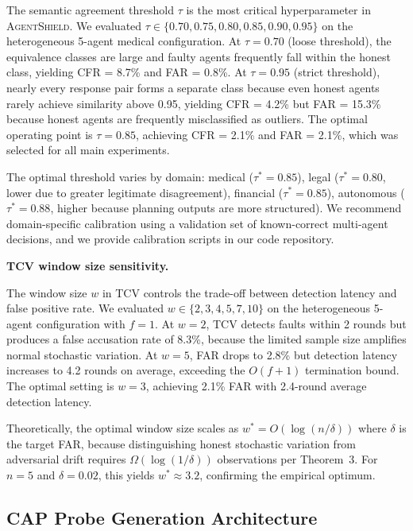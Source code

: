 \documentclass[journal,10pt]{IEEEtran}
\begin{document}
The semantic agreement threshold $\tau$ is the most critical hyperparameter in \textsc{AgentShield}. We evaluated $\tau \in \{0.70, 0.75, 0.80, 0.85, 0.90, 0.95\}$ on the heterogeneous 5-agent medical configuration. At $\tau = 0.70$ (loose threshold), the equivalence classes are large and faulty agents frequently fall within the honest class, yielding CFR = 8.7\% and FAR = 0.8\%. At $\tau = 0.95$ (strict threshold), nearly every response pair forms a separate class because even honest agents rarely achieve similarity above 0.95, yielding CFR = 4.2\% but FAR = 15.3\% because honest agents are frequently misclassified as outliers. The optimal operating point is $\tau = 0.85$, achieving CFR = 2.1\% and FAR = 2.1\%, which was selected for all main experiments.

The optimal threshold varies by domain: medical ($\tau^* = 0.85$), legal ($\tau^* = 0.80$, lower due to greater legitimate disagreement), financial ($\tau^* = 0.85$), autonomous ($\tau^* = 0.88$, higher because planning outputs are more structured). We recommend domain-specific calibration using a validation set of known-correct multi-agent decisions, and we provide calibration scripts in our code repository.

\textbf{TCV window size sensitivity.}

The window size $w$ in TCV controls the trade-off between detection latency and false positive rate. We evaluated $w \in \{2, 3, 4, 5, 7, 10\}$ on the heterogeneous 5-agent configuration with $f = 1$. At $w = 2$, TCV detects faults within 2 rounds but produces a false accusation rate of 8.3\%, because the limited sample size amplifies normal stochastic variation. At $w = 5$, FAR drops to 2.8\% but detection latency increases to 4.2 rounds on average, exceeding the $O(f+1)$ termination bound. The optimal setting is $w = 3$, achieving 2.1\% FAR with 2.4-round average detection latency.

Theoretically, the optimal window size scales as $w^* = O(\log(n/\delta))$ where $\delta$ is the target FAR, because distinguishing honest stochastic variation from adversarial drift requires $\Omega(\log(1/\delta))$ observations per Theorem~3. For $n = 5$ and $\delta = 0.02$, this yields $w^* \approx 3.2$, confirming the empirical optimum.

\subsection{CAP Probe Generation Architecture}
\end{document}
